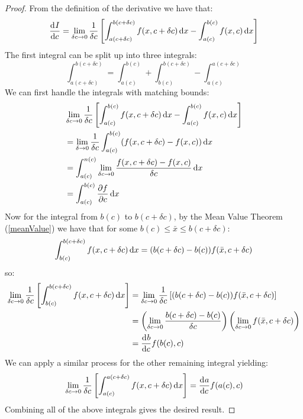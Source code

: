 \documentclass[../main.tex]{subfiles}
\begin{document}
\begin{proof}
  From the definition of the derivative we have that:
  \begin{align*}
    \deriv{I}{c} &= \lim_{\delta c \to 0} \frac{1}{\delta c} \left[\int_{a(c + \delta c)}^{b(c + \delta c)} f(x, c + \delta c) \d{x} - \int_{a(c)}^{b(c)} f(x, c) \d{x}\right] \\
  \end{align*}
  The first integral can be split up into three integrals:
  \[
    \int_{a(c + \delta c)}^{b(c + \delta c)} = \int_{a(c)}^{b(c)} + \int_{b(c)}^{b(c + \delta c)} - \int_{a(c)}^{a(c + \delta c)}
  \]
We can first handle the integrals with matching bounds:
\begin{align*}
  &\lim_{\delta c \to 0} \frac{1}{\delta c} \left[\int_{a(c)}^{b(c)} f(x, c + \delta c) \d{x} - \int_{a(c)}^{b(c)} f(x, c) \d{x}\right] \\
  &= \lim_{\delta \to 0} \frac{1}{\delta c} \int_{a(c)}^{b(c)} (f(x, c + \delta c) - f(x, c)) \d{x} \\
  &= \int_{a(c)}^{n(c)} \lim_{\delta c \to 0} \frac{f(x, c + \delta c) - f(x, c)}{\delta c} \d{x} \\
  &= \int_{a(c)}^{b(c)} \pderiv{f}{c} \d{x}
\end{align*}
Now for the integral from $b(c)$ to $b(c + \delta c)$, by the Mean Value Theorem (\cref{meanValue}) we have that for some $b(c) \leq \bar{x} \leq b(c + \delta c)$:
\[
  \int_{b(c)}^{b(c + \delta c)} f(x, c + \delta c) \,\mathrm{d} x = (b(c + \delta c) - b(c))f(\bar{x}, c + \delta c)
\]
so:
\begin{align*}
  \lim_{\delta c \to 0} \frac{1}{\delta c} \left[\int_{b(c)}^{b(c + \delta c)} f(x, c + \delta c) \d{x}\right] &= \lim_{\delta c \to 0} \frac{1}{\delta c} \left[(b(c + \delta c) - b(c))f(\bar{x}, c + \delta c)\right] \\
  &= \left(\lim_{\delta c \to 0} \frac{b(c + \delta c) - b(c)}{\delta c} \right)\left(\lim_{\delta c \to 0} f(\bar{x}, c + \delta c)\right) \\
  &= \deriv{b}{c} f(b(c), c)
\end{align*}
We can apply a similar process for the other remaining integral yielding:
\[
  \lim_{\delta c \to 0} \frac{1}{\delta c} \left[\int_{a(c)}^{a(c + \delta c)} f(x, c + \delta c) \d{x}\right] = \deriv{a}{c} f(a(c), c)
\]
Combining all of the above integrals gives the desired result.
\end{proof}
\end{document}
